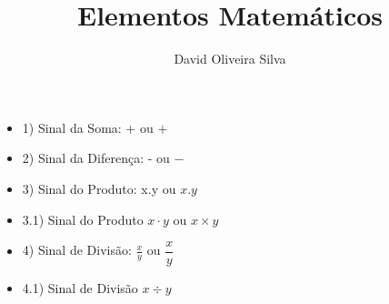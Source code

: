 \documentclass[a4paper,12pt]{article}
\begin{document}
\title{Elementos Matemáticos}
\author{David Oliveira Silva}
\maketitle
  
\begin{itemize} %
    \item 1) Sinal da Soma: + ou $+$
    \item [] 2) Sinal da Diferença: - ou $-$ %
    \item 3) Sinal do Produto: x.y ou $x.y$
    \item [] 3.1) Sinal do Produto $x\cdot y$ ou $x\times y$
    \item [] 4) Sinal de Divisão: $\frac{x}{y}$ ou $\dfrac{x}{y}$
    \item [] 4.1) Sinal de Divisão $x\div y$
\end{itemize}
\end{document}
